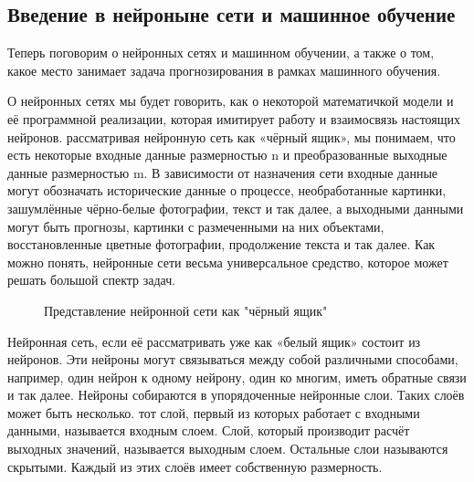 \subsection*{Введение в нейроныне сети и машинное обучение} %
{\cyrillicfont %
\fontsize{13pt}{16.25pt}\selectfont %
\setlength{\parindent}{1.25cm} %
\englishfont %

  \par Теперь поговорим о нейронных сетях и машинном обучении, а также о том, какое место занимает задача прогнозирования в рамках машинного обучения. 

  \par О нейронных сетях мы будет говорить, как о некоторой математичкой модели и её программной реализации, которая имитирует работу и взаимосвязь настоящих нейронов.  рассматривая нейронную сеть как «чёрный ящик», мы понимаем, что есть некоторые входные данные размерностью n и преобразованные выходные данные размерностью m. В зависимости от назначения сети входные данные могут обозначать исторические данные о процессе, необработанные картинки, зашумлённые чёрно-белые фотографии, текст и так далее, а выходными данными могут быть прогнозы, картинки с размеченными на них объектами, восстановленные цветные фотографии, продолжение текста и так далее. Как можно понять, нейронные сети весьма универсальное средство, которое может решать большой спектр задач. 

  \begin{figure}
    \centering
    \def\svgwidth{\textwidth}
    
    \caption{Представление нейронной сети как "чёрный ящик"}
    \label{fig:NNBlackBox}
  \end{figure}

  \par Нейронная сеть, если её рассматривать уже как «белый ящик» состоит из нейронов. Эти нейроны могут связываться между собой различными способами, например, один нейрон к одному нейрону, один ко многим, иметь обратные связи и так далее. Нейроны собираются в упорядоченные нейронные слои. Таких слоёв может быть несколько. тот слой, первый из которых работает с входными данными, называется входным слоем. Слой, который производит расчёт выходных значений, называется выходным слоем. Остальные слои называются скрытыми. Каждый из этих слоёв имеет собственную размерность. 

}
